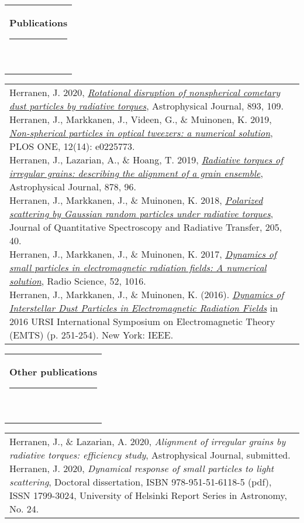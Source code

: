 \documentclass[11pt,A4]{article}
\newcommand{\mpwidth}{\linewidth-\fboxsep-\fboxsep}
\newcommand{\cvtext}[1] {
	\begin{tabular*}{1\mpwidth}{p{0.98\mpwidth}}
		\parbox{1\mpwidth}{#1}
	\end{tabular*}
}
\newcommand{\cvsection}[1] {
	\vspace{14pt}
	\cvtext{
		\textbf{\LARGE{\textcolor{darkcol}{{#1}}}}\\[-4pt]
		\textcolor{maincol}{ \rule{0.1\textwidth}{2pt} } \\
	}
}
\begin{document}
\begin{paracol}{2}
\begin{rightcolumn}
			\cvsection{Publications}
			
			\cvtext{
				
				Herranen, J. 2020, \emph{\href{https://doi.org/10.3847/1538-4357/ab8009}{Rotational disruption of nonspherical cometary dust particles by radiative torques}}, Astrophysical Journal, 893, 109. \\[-5pt]
				
				Herranen, J., Markkanen, J., Videen, G., \& Muinonen, K. 2019, \emph{\href{https://doi.org/10.1371/journal.pone.0225773}{Non-spherical particles in optical tweezers: a numerical solution}}, PLOS ONE, 12(14): e0225773.\\[-5pt]
				
				Herranen, J., Lazarian, A., \& Hoang, T. 2019, \emph{\href{https://doi.org/10.3847\%2F1538-4357\%2Fab1eb3}{Radiative torques of irregular grains: describing the alignment of a grain ensemble}}, Astrophysical Journal, 878, 96.\\[-5pt]
				
				Herranen, J., Markkanen, J., \& Muinonen, K. 2018, \emph{\href{https://doi.org/10.1016/j.jqsrt.2017.09.033}{Polarized scattering by Gaussian random particles under radiative torques}}, Journal of Quantitative Spectroscopy and Radiative Transfer, 205, 40.\\[-5pt]
				
				Herranen, J., Markkanen, J., \& Muinonen, K. 2017, \emph{\href{https://doi.org/10.1002/2017RS006333}{Dynamics of small particles in electromagnetic radiation fields: A numerical solution}}, Radio Science, 52, 1016.\\[-5pt]
				
				Herranen, J., Markkanen, J., \& Muinonen, K. (2016). \emph{\href{https://doi.org/10.1109/URSI-EMTS.2016.7571366}{Dynamics of Interstellar Dust Particles in Electromagnetic Radiation Fields}} in 2016 URSI International Symposium on Electromagnetic Theory (EMTS) (p. 251-254). New York: IEEE.
				
			}
			
			\cvsection{Other publications}
			
			\cvtext{
				
				Herranen, J., \& Lazarian, A. 2020, \emph{Alignment of irregular grains by radiative torques: efficiency study}, Astrophysical Journal, submitted.\\
				
				Herranen, J. 2020, \emph{Dynamical response of small particles to light scattering}, Doctoral dissertation, ISBN 978-951-51-6118-5 (pdf), ISSN 1799-3024, University of Helsinki Report Series in Astronomy, No. 24.
				
}
\end{rightcolumn}
\end{paracol}
\end{document}
